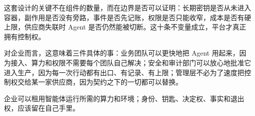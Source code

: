 这套设计的关键不在组件的数量，而在边界是否可以证明：长期密钥是否从未进入容器，副作用是否没有旁路，事件是否先记账，权限是否只能收窄，成本是否有硬上限，供应商失联时 Agent 是否仍然能被切断。这十条不变量成立，平台才真正拥有控制权。

对企业而言，这意味着三件具体的事：业务团队可以更快地把 Agent 用起来，因为接入、算力和权限不需要每个团队自己解决；安全和审计部门可以放心地批准它进入生产，因为每一次行动都有出口、有记录、有上限；管理层不必为了速度把控制权交给某一家供应商，因为契约之下的一切都可以替换。

企业可以租用智能体运行所需的算力和环境；身份、钥匙、决定权、事实和退出权，应该留在自己手里。
